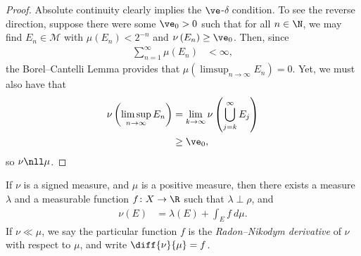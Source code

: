 \documentclass[10pt]{mypackage}
\begin{document}
\begin{proof}
  Absolute continuity clearly implies the $\ve$-$\delta$ condition. To see the reverse direction, suppose there were some $\ve_0 > 0$ such that for all $n\in \N$, we may find $E_n\in \mathcal{M}$ with $\mu\left( E_n \right) < 2^{-n}$ and $\nu\left( E_n \right) \geq \ve_0$. Then, since
  \begin{align*}
    \sum_{n=1}^{\infty}\mu\left( E_n \right) &< \infty,
  \end{align*}
  the Borel--Cantelli Lemma provides that $\mu\left( \limsup_{n\rightarrow\infty}E_n \right) = 0$. Yet, we must also have that
  \begin{align*}
    \nu\left( \limsup_{n\rightarrow\infty}E_n \right) &= \lim_{k\rightarrow\infty}\nu\left( \bigcup_{j=k}^{\infty}E_j \right)\\
                                                      &\geq \ve_0,
  \end{align*}
  so $\nu\nll\mu$.
\end{proof}
\begin{theorem}
  If $\nu$ is a signed measure, and $\mu$ is a positive measure, then there exists a measure $\lambda$ and a measurable function $f\colon X\rightarrow \R$ such that $\lambda\perp\rho$, and
  \begin{align*}
    \nu\left( E \right) &= \lambda\left( E \right) + \int_{E}^{} f\:d\mu.
  \end{align*}
  If $\nu\ll\mu$, we say the particular function $f$ is the \textit{Radon--Nikodym derivative} of $\nu$ with respect to $\mu$, and write $\diff{\nu}{\mu} = f$.
\end{theorem}
\end{document}
